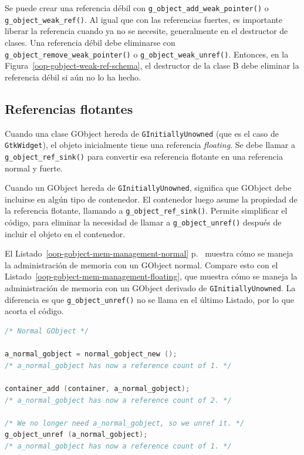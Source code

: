 Se puede crear una referencia débil con \lstinline{g_object_add_weak_pointer()} o \lstinline{g_object_weak_ref()}. Al igual que con las referencias fuertes, es importante liberar la referencia cuando ya no se necesite, generalmente en el destructor de clases. Una referencia débil debe eliminarse con \lstinline{g_object_remove_weak_pointer()} o \lstinline{g_object_weak_unref()}. Entonces, en la Figura~\ref{oop-gobject-weak-ref-schema}, el destructor de la clase B debe eliminar la referencia débil si aún no lo ha hecho.

\subsection{Referencias flotantes}

Cuando una clase GObject hereda de \lstinline{GInitiallyUnowned} (que es el caso de \lstinline{GtkWidget}), el objeto inicialmente tiene una referencia \emph{floating}. Se debe llamar a \lstinline{g_object_ref_sink()} para convertir esa referencia flotante en una referencia normal y fuerte.

Cuando un GObject hereda de \lstinline{GInitiallyUnowned}, significa que GObject debe incluirse en algún tipo de contenedor. El contenedor luego asume la propiedad de la referencia flotante, llamando a \lstinline{g_object_ref_sink()}. Permite simplificar el código, para eliminar la necesidad de llamar a \lstinline{g_object_unref()} después de incluir el objeto en el contenedor.

El Listado~\ref{oop-gobject-mem-management-normal} p.~\pageref{oop-gobject-mem-management-normal} muestra cómo se maneja la administración de memoria con un GObject normal. Compare esto con el Listado~\ref{oop-gobject-mem-management-floating}, que muestra cómo se maneja la administración de memoria con un GObject derivado de \lstinline{GInitiallyUnowned}. La diferencia es que \lstinline{g_object_unref()} no se llama en el último Listado, por lo que acorta el código.

\begin{lstlisting}[language=C, caption={Gestión de la memoria de GObjects normales.}, label=oop-gobject-mem-management-normal]
/* Normal GObject */

a_normal_gobject = normal_gobject_new ();
/* a_normal_gobject has now a reference count of 1. */

container_add (container, a_normal_gobject);
/* a_normal_gobject has now a reference count of 2. */

/* We no longer need a_normal_gobject, so we unref it. */
g_object_unref (a_normal_gobject);
/* a_normal_gobject has now a reference count of 1. */
\end{lstlisting}

